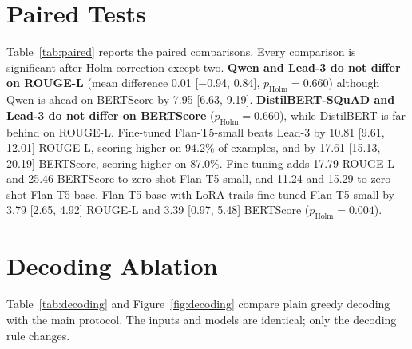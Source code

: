 \section{Paired Tests}

Table~\ref{tab:paired} reports the paired comparisons. Every comparison is significant after Holm correction except two. \textbf{Qwen and Lead-3 do not differ on ROUGE-L} (mean difference 0.01 [$-$0.94, 0.84], $p_\text{Holm} = 0.660$) although Qwen is ahead on BERTScore by 7.95 [6.63, 9.19]. \textbf{DistilBERT-SQuAD and Lead-3 do not differ on BERTScore} ($p_\text{Holm} = 0.660$), while DistilBERT is far behind on ROUGE-L. Fine-tuned Flan-T5-small beats Lead-3 by 10.81 [9.61, 12.01] ROUGE-L, scoring higher on 94.2\% of examples, and by 17.61 [15.13, 20.19] BERTScore, scoring higher on 87.0\%. Fine-tuning adds 17.79 ROUGE-L and 25.46 BERTScore to zero-shot Flan-T5-small, and 11.24 and 15.29 to zero-shot Flan-T5-base. Flan-T5-base with LoRA trails fine-tuned Flan-T5-small by 3.79 [2.65, 4.92] ROUGE-L and 3.39 [0.97, 5.48] BERTScore ($p_\text{Holm} = 0.004$).

\begin{table}[htbp]
    \centering
    \footnotesize
    \caption[Paired tests]{Paired comparisons on the 138 test examples. $\Delta$: mean per-example difference (A $-$ B) with 95\% trial-level CI. Win\,\%: share of examples on which A scores higher. $p$: Wilcoxon signed-rank, Holm-corrected over all 20 comparisons. Systems use the main protocol unless marked ``plain greedy''.}
    \label{tab:paired}
\end{table}

\section{Decoding Ablation}
\label{sec:decoding}

Table~\ref{tab:decoding} and Figure~\ref{fig:decoding} compare plain greedy decoding with the main protocol. The inputs and models are identical; only the decoding rule changes.

